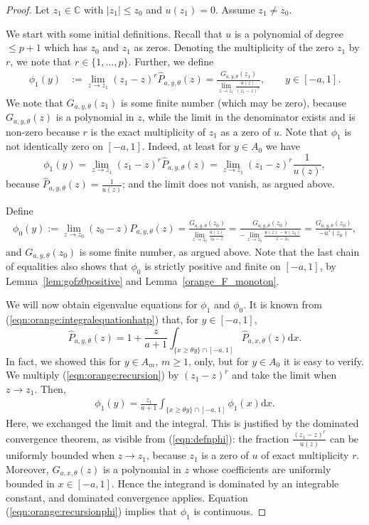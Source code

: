 \documentclass[12pt]{article}
\newcommand{\C}{\mathbb{C}} %
\newcommand{\1}{\mathds{1}}
\renewcommand{\d}{\mathrm{d}}
\theoremstyle{definition}
\theoremstyle{plain}
\theoremstyle{remark}
\begin{document}
\begin{proof}
Let $z_1\in\C$ with $|z_1|\leq z_0$ and $u(z_1)=0$. Assume $z_1\neq z_0$.

We start with some initial definitions. Recall that $u$ is a polynomial of degree $\leq p+1$ which has $z_0$ and $z_1$ as zeros. Denoting the multiplicity of the zero $z_1$ by $r$, we note that $r\in\{1,\ldots,p\}$. Further, we define
\begin{align} \label{eqn:defnphi}
\phi_1(y) & :=\lim_{z\to z_1} (z_1-z)^r \hat P_{a,y,\theta}(z) = \frac{G_{a,y,\theta}(z_1)}{\lim_{z\to z_1} \frac{u(z)}{(z_1-z)^r} },\qquad y\in[-a,1].
\end{align}
We note that $G_{a,y,\theta}(z_1)$ is some finite number (which may be zero), because $G_{a,y,\theta}(z)$ is a polynomial in $z$, while the limit in the denominator exists and is non-zero because $r$ is the exact multiplicity of $z_1$ as a zero of $u$.
Note that $\phi_1$ is not identically zero on $[-a,1]$. Indeed, at least for $y\in A_0$ we have
$$
\phi_1(y)=\lim_{z\to z_1} (z_1-z)^r \hat P_{a,y,\theta}(z) = \lim_{z\to z_1} (z_1-z)^r \frac{1}{u(z)},
$$
because $\hat P_{a,y,\theta}(z)=\frac{1}{u(z)}$; and the limit does not vanish, as argued above.

Define
\begin{align*} %
\phi_0(y):=\lim_{z\to z_0} (z_0-z) \hat P_{a,y,\theta}(z) =\frac{G_{a,y,\theta}(z_0)}{\lim_{z\to z_0} \frac{u(z)}{z_0-z} } = \frac{G_{a,y,\theta}(z_0)}{- \lim_{z\to z_0} \frac{u(z)-u(z_0)}{z-z_0} } =\frac{G_{a,y,\theta}(z_0)}{-u'(z_0)},
\end{align*}
and $G_{a,y,\theta}(z_0)$ is some finite number, as argued above.
Note that the last chain of equalities also shows that $\phi_0$ is strictly positive and finite on $[-a,1]$, by  Lemma~\ref{lem:gofz0positive} and Lemma~\ref{orange_F_monoton}.

We will now obtain eigenvalue equations for $\phi_1$ and $\phi_0$.
It is known from (\ref{eqn:orange:integralequationhatp}) that, for $y\in[-a,1]$, 
\begin{equation} \label{eqn:orange:recursion}
\hat{P}_{a,y,\theta}(z) =1+\frac{z}{a+1}\int_{\{x\geq \theta y\}\cap[-a,1]} \hat{P}_{a,x,\theta}(z)\d x.
\end{equation}
In fact, we showed this for $y\in A_m$, $m\geq 1$, only, but for $y\in A_0$ it is easy to verify.
We multiply (\ref{eqn:orange:recursion}) by $(z_1-z)^r$ and take the limit when $z\to z_1$. Then,
\begin{align} \label{eqn:orange:recursionphi}
\phi_1(y) =\frac{z_1}{a+1}\int_{\{x\geq \theta y\}\cap[-a,1]} \phi_1(x) \d x.
\end{align}
Here, we exchanged the limit and the integral. This is justified by the dominated convergence theorem, as visible from (\ref{eqn:defnphi}): the fraction $\frac{(z_1-z)^r}{u(z)}$ can be uniformly bounded when $z\to z_1$, because $z_1$ is a zero of $u$ of exact multiplicity $r$. Moreover, $G_{a,x,\theta}(z)$ is a polynomial in $z$ whose coefficients are uniformly bounded in $x\in[-a,1]$. Hence the integrand is dominated by an integrable constant, and dominated convergence applies. Equation (\ref{eqn:orange:recursionphi}) implies that $\phi_1$ is continuous.


\end{proof}
\end{document}
